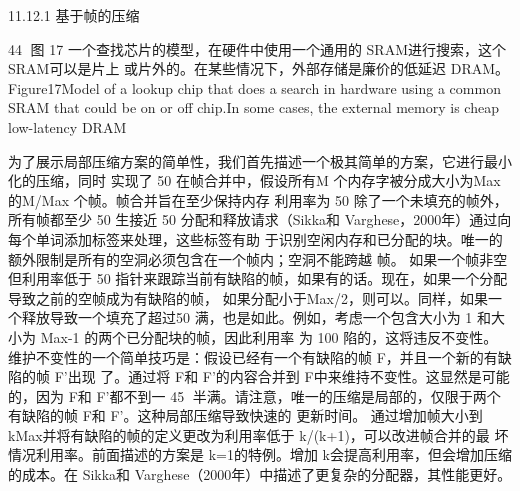 11.12.1 基于帧的压缩



                                                         44
图 17 一个查找芯片的模型，在硬件中使用一个通用的 SRAM进行搜索，这个 SRAM可以是片上
或片外的。在某些情况下，外部存储是廉价的低延迟 DRAM。
Figure17Model of a lookup chip that does a search in hardware using a common SRAM
that could be on or off chip.In some cases, the external memory is cheap low-latency
DRAM

为了展示局部压缩方案的简单性，我们首先描述一个极其简单的方案，它进行最小化的压缩，同时
实现了 50%
在帧合并中，假设所有M 个内存字被分成大小为Max 的M/Max 个帧。帧合并旨在至少保持内存
利用率为 50%
除了一个未填充的帧外，所有帧都至少 50%
生接近 50
分配和释放请求（Sikka和 Varghese，2000年）通过向每个单词添加标签来处理，这些标签有助
于识别空闲内存和已分配的块。唯一的额外限制是所有的空洞必须包含在一个帧内；空洞不能跨越
帧。
如果一个帧非空但利用率低于 50%
指针来跟踪当前有缺陷的帧，如果有的话。现在，如果一个分配导致之前的空帧成为有缺陷的帧，
如果分配小于Max/2，则可以。同样，如果一个释放导致一个填充了超过50%
满，也是如此。例如，考虑一个包含大小为 1 和大小为 Max-1 的两个已分配块的帧，因此利用率
为 100%
陷的，这将违反不变性。
维护不变性的一个简单技巧是：假设已经有一个有缺陷的帧 F，并且一个新的有缺陷的帧 F’出现
了。通过将 F和 F’的内容合并到 F中来维持不变性。这显然是可能的，因为 F和 F’都不到一
                                                                                   45
半满。请注意，唯一的压缩是局部的，仅限于两个有缺陷的帧 F和 F’。这种局部压缩导致快速的
更新时间。
通过增加帧大小到 kMax并将有缺陷的帧的定义更改为利用率低于 k/(k+1)，可以改进帧合并的最
坏情况利用率。前面描述的方案是 k=1的特例。增加 k会提高利用率，但会增加压缩的成本。在
Sikka和 Varghese（2000年）中描述了更复杂的分配器，其性能更好。



